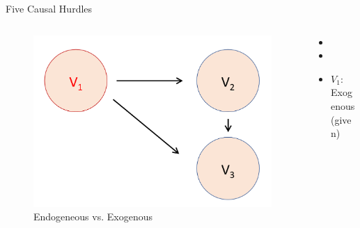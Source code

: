 \documentclass[xcolor=dvipsnames]{beamer}
\begin{document}
	\begin{frame}[fragile]{Five Causal Hurdles}
		\begin{columns}[T]
			\begin{column}{0.6\textwidth}
				\begin{figure}
	        \centering
	        \includegraphics[width=0.8\linewidth]{endogeneity2.png}
        	\caption{Endogeneous vs. Exogenous}
	        \label{fig3}
	      \end{figure}
			\end{column}
			
	\begin{column}{0.36\textwidth}
			\begin{itemize}
			  \item[]
			  \item[]
			  \item $V_1$: Exogenous (given)
			 \end{itemize}
			\end{column}
		\end{columns}
	\end{frame}
	
\end{document}
